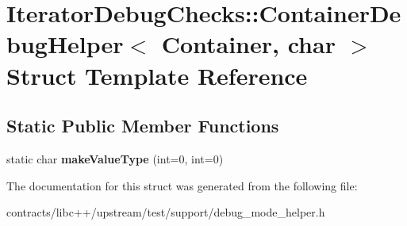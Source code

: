 \hypertarget{struct_iterator_debug_checks_1_1_container_debug_helper_3_01_container_00_01char_01_4}{}\section{Iterator\+Debug\+Checks\+:\+:Container\+Debug\+Helper$<$ Container, char $>$ Struct Template Reference}
\label{struct_iterator_debug_checks_1_1_container_debug_helper_3_01_container_00_01char_01_4}
\subsection*{Static Public Member Functions}
\begin{DoxyCompactItemize}
\item 
\mbox{\label{struct_iterator_debug_checks_1_1_container_debug_helper_3_01_container_00_01char_01_4_a41486b3a93ac5d48c67418b52efac6e6}} 
static char {\bfseries make\+Value\+Type} (int=0, int=0)
\end{DoxyCompactItemize}


The documentation for this struct was generated from the following file\+:\begin{DoxyCompactItemize}
\item 
contracts/libc++/upstream/test/support/debug\+\_\+mode\+\_\+helper.\+h\end{DoxyCompactItemize}
